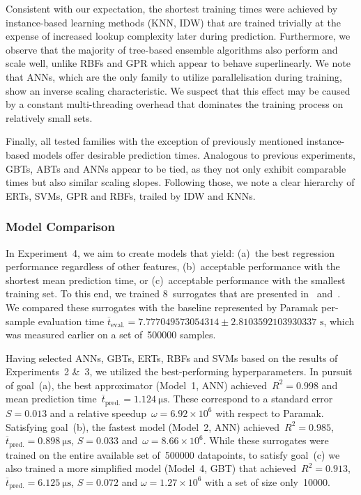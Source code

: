 Consistent with our expectation, the shortest training times were achieved by
instance-based learning methods (KNN, IDW) that
are trained trivially at the expense of increased lookup complexity later during prediction.
Furthermore, we observe that the majority of tree-based ensemble algorithms also perform
and scale well, unlike RBFs and GPR which appear to behave superlinearly. We note that ANNs,
which are the only family to utilize parallelisation during training, show an
inverse scaling characteristic. We suspect that this effect may be caused
by a constant multi-threading overhead that dominates the training process
on relatively small sets.

Finally, all tested families with the exception of previously mentioned instance-based
models offer desirable prediction times. Analogous to previous experiments,
GBTs, ABTs and ANNs appear to be tied, as they not only exhibit
comparable times but also similar scaling slopes. Following those, we note a
clear hierarchy of ERTs, SVMs, GPR and RBFs, trailed by IDW and KNNs.


\subsubsection{Model Comparison}
\label{sec:res-exp4}
{
In Experiment~4, we aim to create models that yield:
(a)~the best regression performance regardless
of other features, (b)~acceptable performance with the shortest mean
prediction time, or (c)~acceptable performance with the smallest training set.
To this end, we trained 8~surrogates that are presented in~
and~. We compared these
surrogates with the baseline represented by Paramak per-sample evaluation time $\overline{t}_{\text{eval.}}=\num{7.777049573054314} \pm
\num{2.8103592103930337} \text{ s}$, which was measured earlier on a set of~\num{500000} samples.
}

Having selected ANNs, GBTs, ERTs, RBFs and SVMs based on the results of
Experiments~2 \&~3, we utilized the best-performing hyperparameters.
In pursuit of goal~(a), the best approximator (Model~1,
ANN) achieved~$R^2=\num{0.998}$ and mean prediction
time~$\overline{t}_{\text{pred.}}=\SI{1.124}{\micro\second}$. These correspond
to a standard error~$S=\num{0.013}$ and a relative speedup~$\omega=\num{6.92} \times {10^6}$
with respect to Paramak. Satisfying
goal~(b), the fastest model (Model~2, ANN) achieved~$R^2=\num{0.985}$,
$\overline{t}_{\text{pred.}}=\SI{0.898}{\micro\second}$, $S=\num{0.033}$
and~$\omega=\num{8.66} \times {10^6}$.
While these surrogates
were trained on the entire available set of~\num{500000} datapoints, to satisfy
goal~(c) we also trained a more simplified model (Model~4, GBT)
that achieved~$R^2=\num{0.913}$,
$\overline{t}_{\text{pred.}}=\SI{6.125}{\micro\second}$, $S=\num{0.072}$ and $\omega=\num{1.27} \times {10^6}$
with a set of size only~\num{10000}.


